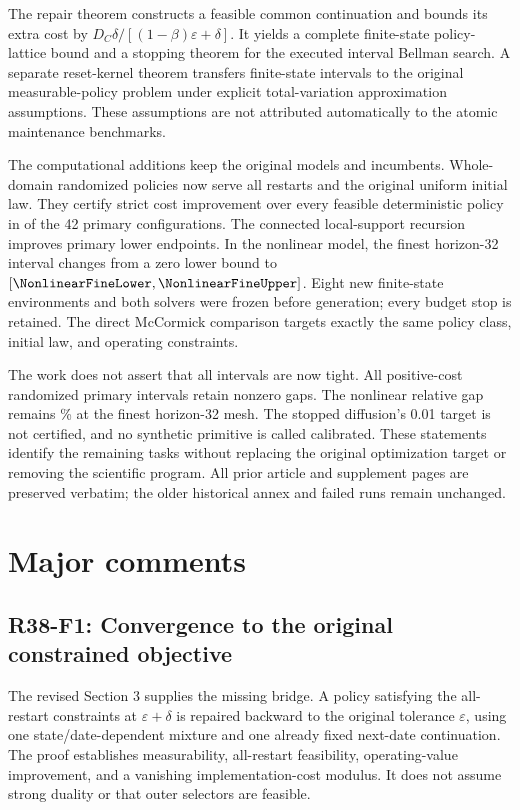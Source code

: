 The repair theorem constructs a feasible common continuation and bounds its extra cost by $D_C\delta/[(1-\beta)\varepsilon+\delta]$. It yields a complete finite-state policy-lattice bound and a stopping theorem for the executed interval Bellman search. A separate reset-kernel theorem transfers finite-state intervals to the original measurable-policy problem under explicit total-variation approximation assumptions. These assumptions are not attributed automatically to the atomic maintenance benchmarks.

The computational additions keep the original models and incumbents. Whole-domain randomized policies now serve all restarts and the original uniform initial law. They certify strict cost improvement over every feasible deterministic policy in \PrimaryStrict{} of the 42 primary configurations. The connected local-support recursion improves \LocalImproveCount{} primary lower endpoints. In the nonlinear model, the finest horizon-32 interval changes from a zero lower bound to $[\NonlinearFineLower,\NonlinearFineUpper]$. Eight new finite-state environments and both solvers were frozen before generation; every budget stop is retained. The direct McCormick comparison targets exactly the same policy class, initial law, and operating constraints.

The work does not assert that all intervals are now tight. All \PrimaryPositive{} positive-cost randomized primary intervals retain nonzero gaps. The nonlinear relative gap remains \NonlinearFineRelative\% at the finest horizon-32 mesh. The stopped diffusion's 0.01 target is not certified, and no synthetic primitive is called calibrated. These statements identify the remaining tasks without replacing the original optimization target or removing the scientific program. All prior article and supplement pages are preserved verbatim; the older historical annex and failed runs remain unchanged.

\section{Major comments}
\subsection{R38-F1: Convergence to the original constrained objective}
The revised Section 3 supplies the missing bridge. A policy satisfying the all-restart constraints at $\varepsilon+\delta$ is repaired backward to the original tolerance $\varepsilon$, using one state/date-dependent mixture and one already fixed next-date continuation. The proof establishes measurability, all-restart feasibility, operating-value improvement, and a vanishing implementation-cost modulus. It does not assume strong duality or that outer selectors are feasible.

